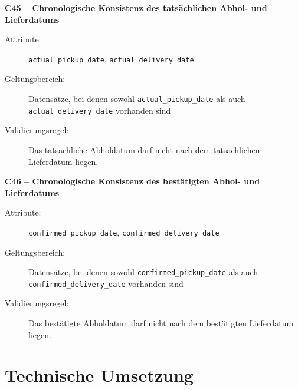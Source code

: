 \documentclass[../main.tex]{subfiles}
\begin{document}
\medskip 
\noindent\textbf{C45 -- Chronologische Konsistenz des tatsächlichen Abhol- und Lieferdatums} 
\begin{description} 
    \item[Attribute:] \texttt{actual\_pickup\_date}, \texttt{actual\_delivery\_date} 
    \item[Geltungsbereich:] Datensätze, bei denen sowohl \texttt{actual\_pickup\_date} als auch \\ \texttt{actual\_delivery\_date} vorhanden sind 
    \item[Validierungsregel:] Das tatsächliche Abholdatum darf nicht nach dem tatsächlichen Lieferdatum liegen. 
\end{description}

\medskip 
\noindent\textbf{C46 -- Chronologische Konsistenz des bestätigten Abhol- und Lieferdatums} 
\begin{description} 
    \item[Attribute:] \texttt{confirmed\_pickup\_date}, \texttt{confirmed\_delivery\_date} 
    \item[Geltungsbereich:] Datensätze, bei denen sowohl \texttt{confirmed\_pickup\_date} als auch \\ \texttt{confirmed\_delivery\_date} vorhanden sind 
    \item[Validierungsregel:] Das bestätigte Abholdatum darf nicht nach dem bestätigten Lieferdatum liegen. 
\end{description}

\section{Technische Umsetzung}
\end{document}
